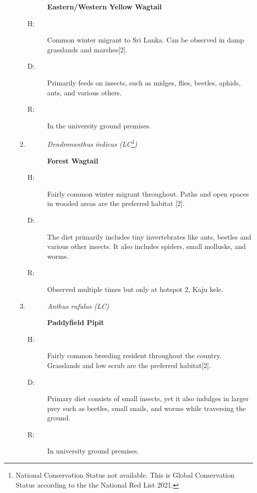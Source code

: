 \begin{itemize}
\begin{enumerate}
\begin{description}
\item[]%
\textbf{Eastern/Western Yellow Wagtail}%
\end{description}%
\begin{description}%
\item[H: ]%
Common winter migrant to Sri Lanka. Can be observed in damp grasslands and marshes{[}2{]}.%
\item[D: ]%
Primarily feeds on insects, such as midges, flies, beetles, aphids, ants, and various others.%
\item[R: ]%
In the university ground premises.%
\end{description}%
\item%
\begin{description}%
\item[]%
\textit{Dendronanthus indicus (LC\footnote{National Conservation Status not available. This is Global Conservation Status according to the the National Red List 2021.})}%
\item[]%
\textbf{Forest Wagtail}%
\end{description}%
\begin{description}%
\item[H: ]%
Fairly common winter migrant throughout. Paths and open spaces in wooded areas are the preferred habitat
{[}2{]}.%
\item[D: ]%
The diet primarily includes tiny invertebrates like ants, beetles and various other insects. It also includes spiders, small mollusks, and worms.%
\item[R: ]%
Observed multiple times but only at hotspot 2, Kaju kele.%
\end{description}%
\item%
\begin{description}%
\item[]%
\textit{Anthus rufulus (LC)}%
\item[]%
\textbf{Paddyfield Pipit}%
\end{description}%
\begin{description}%
\item[H: ]%
Fairly common breeding resident throughout the country. Grasslands and low scrub are the preferred habitat{[}2{]}.%
\item[D: ]%
Primary diet consists of small insects, yet it also indulges in larger prey such as beetles, small snails, and worms while traversing the ground. %
\item[R: ]%
In university ground premises.%
\end{description}%

\end{enumerate}
\end{itemize}
